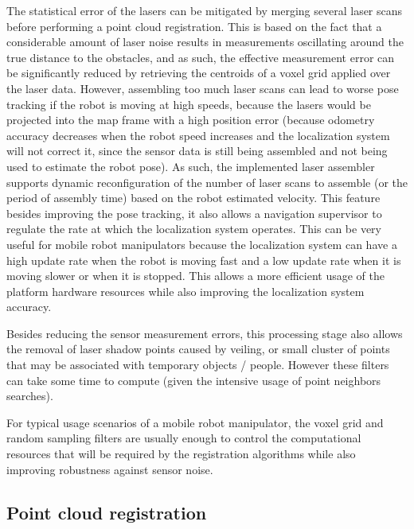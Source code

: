 The statistical error of the lasers can be mitigated by merging several laser scans before performing a point cloud registration. This is based on the fact that a considerable amount of laser noise results in measurements oscillating around the true distance to the obstacles, and as such, the effective measurement error can be significantly reduced by retrieving the centroids of a voxel grid applied over the laser data. However, assembling too much laser scans can lead to worse pose tracking if the robot is moving at high speeds, because the lasers would be projected into the map frame with a high position error (because odometry accuracy decreases when the robot speed increases and the localization system will not correct it, since the sensor data is still being assembled and not being used to estimate the robot pose). As such, the implemented laser assembler supports dynamic reconfiguration of the number of laser scans to assemble (or the period of assembly time) based on the robot estimated velocity. This feature besides improving the pose tracking, it also allows a navigation supervisor to regulate the rate at which the localization system operates. This can be very useful for mobile robot manipulators because the localization system can have a high update rate when the robot is moving fast and a low update rate when it is moving slower or when it is stopped. This allows a more efficient usage of the platform hardware resources while also improving the localization system accuracy.

Besides reducing the sensor measurement errors, this processing stage also allows the removal of laser shadow points caused by veiling, or small cluster of points that may be associated with temporary objects / people. However these filters can take some time to compute (given the intensive usage of point neighbors searches).

For typical usage scenarios of a mobile robot manipulator, the voxel grid and random sampling filters are usually enough to control the computational resources that will be required by the registration algorithms while also improving robustness against sensor noise.



\subsection{Point cloud registration}

